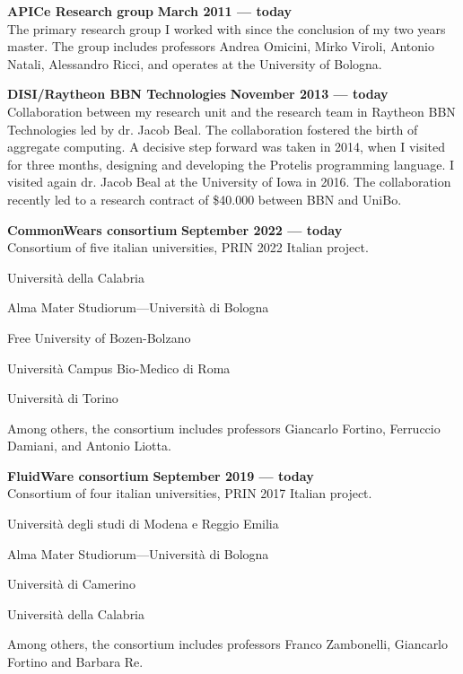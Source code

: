 \textbf{APICe Research group} \hfill \textbf{March 2011 --- today}\\
The primary research group I worked with since the conclusion of my two years master. The group includes professors Andrea Omicini, Mirko Viroli, Antonio Natali, Alessandro Ricci, and operates at the University of Bologna.

\halfblankline{}

\textbf{DISI/Raytheon BBN Technologies} \hfill \textbf{November 2013 --- today}\\
Collaboration between my research unit and the research team in Raytheon BBN Technologies led by dr. Jacob Beal. The collaboration fostered the birth of aggregate computing. A decisive step forward was taken in 2014, when I visited for three months, designing and developing the Protelis programming language. I visited again dr. Jacob Beal at the University of Iowa in 2016. The collaboration recently led to a research contract of \$40.000 between BBN and UniBo.

\halfblankline{}

\textbf{CommonWears consortium} \hfill \textbf{September 2022 --- today}\\
Consortium of five italian universities, PRIN 2022 Italian project.
\begin{innerlist}
    \item Università della Calabria
    \item Alma Mater Studiorum---Università di Bologna
    \item Free University of Bozen-Bolzano
    \item Università Campus Bio-Medico di Roma
    \item Università di Torino
\end{innerlist}
Among others, the consortium includes professors Giancarlo Fortino, Ferruccio Damiani, and Antonio Liotta.

\halfblankline{}

\textbf{FluidWare consortium} \hfill \textbf{September 2019 --- today}\\
Consortium of four italian universities, PRIN 2017 Italian project.
\begin{innerlist}
    \item Università degli studi di Modena e Reggio Emilia
    \item Alma Mater Studiorum---Università di Bologna
    \item Università di Camerino
    \item Università della Calabria
\end{innerlist}
Among others, the consortium includes professors Franco Zambonelli, Giancarlo Fortino and Barbara Re.

